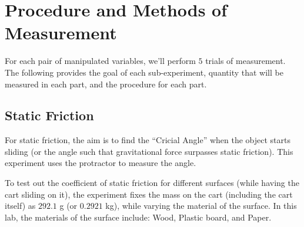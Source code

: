 \documentclass{article}
\begin{document}

\pagebreak

\section{Procedure and Methods of Measurement}
For each pair of manipulated variables, we'll perform $5$ trials of measurement. The following provides the goal of each sub-experiment, quantity that will be measured in each part, and the procedure for each part.

\subsection{Static Friction}
For static friction, the aim is to find the ``Cricial Angle'' when the object starts sliding (or the angle such that gravitational force surpasses static friction).  This experiment uses the protractor to measure the angle.

To test out the coefficient of static friction for different surfaces (while having the cart sliding on it), the experiment fixes the mass on the cart (including the cart itself) as $292.1$ g (or $0.2921$ kg), while varying the material of the surface. In this lab, the materials of the surface include: Wood, Plastic board, and Paper.
\end{document}
